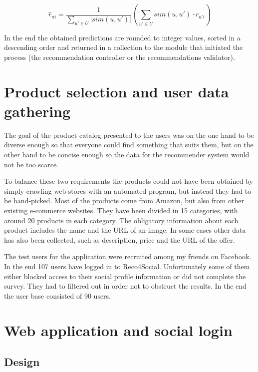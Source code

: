 \documentclass[12pt]{report}
\begin{document}
\begin{equation}
\hat{r}_{ui} = \frac{1}{\displaystyle\sum_{u' \in U} |sim(u,u')|} \left(\displaystyle\sum_{u' \in U} sim(u,u')\cdot r_{u'i}\right)
\label{eq.ratings_weighted}
\end{equation}

In the end the obtained predictions are rounded to integer values, sorted in a descending order and returned in a collection to the module that initiated the process (the recommendation controller or the recommendations validator).







\section{Product selection and user data gathering}
The goal of the product catalog presented to the users was on the one hand to be diverse enough so that everyone could find something that suits them, but on the other hand to be concise enough so the data for the recommender system would not be too scarce.

To balance these two requirements the products could not have been obtained by simply crawling web stores with an automated program, but instead they had to be hand-picked. Most of the products come from Amazon, but also from other existing e-commerce websites. They have been divided in 15 categories, with around 20 products in each category. The obligatory information about each product includes the name and the URL of an image. In some cases other data has also been collected, such as description, price and the URL of the offer.

The test users for the application were recruited among my friends on Facebook. In the end 107 users have logged in to Reco4Social. Unfortunately some of them either blocked access to their social profile information or did not complete the survey. They had to filtered out in order not to obstruct the results. In the end the user base consisted of 90 users.

\section{Web application and social login}
\subsection{Design}
\end{document}
